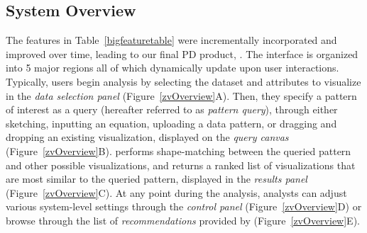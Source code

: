 \subsection{System Overview\label{sec:system}}%
The features in Table~\ref{bigfeaturetable} were incrementally incorporated and improved over time, leading to our final PD product, \zvpp. The \zvpp interface is organized into 5 major regions all of which dynamically update upon user interactions. Typically, users begin analysis by selecting the dataset and attributes to visualize in the \emph{data selection panel} (Figure~\ref{zvOverview}A). Then, they specify a pattern of interest as a query (hereafter referred to as \emph{pattern query}), through either sketching, inputting an equation, uploading a data pattern, or dragging and dropping an existing visualization, displayed on the \emph{query canvas} (Figure~\ref{zvOverview}B). \zvpp performs shape-matching between the queried pattern and other possible visualizations, and returns a ranked list of visualizations that are most similar to the queried pattern, displayed in the \emph{results panel} (Figure~\ref{zvOverview}C). At any point during the analysis, analysts can adjust various system-level settings through the \emph{control panel} (Figure~\ref{zvOverview}D) or browse through the list of \emph{recommendations} provided by \zvpp (Figure~\ref{zvOverview}E).  